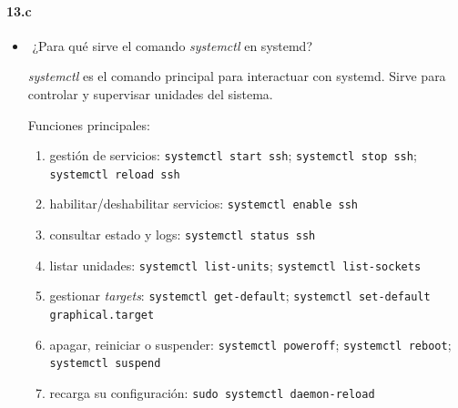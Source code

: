 \documentclass[10pt,a4paper]{paper}
\begin{document}
\paragraph{13.c}
\begin{itemize}
	
	\item​ ¿Para qué sirve el comando \textit{systemctl} en systemd?
	
	\textit{systemctl} es el comando principal para interactuar con systemd. Sirve para controlar y supervisar unidades del sistema.
	
	Funciones principales:
	
	\begin{enumerate}
		\item gestión de servicios: \texttt{systemctl start ssh}; \texttt{systemctl stop ssh}; \texttt{systemctl reload ssh}
		
		\item habilitar/deshabilitar servicios: \texttt{systemctl enable ssh}
		
		\item consultar estado y logs: \texttt{systemctl status ssh}
		
		
		\item listar unidades: \texttt{systemctl list-units}; \texttt{systemctl list-sockets}
		
		\item gestionar \textit{targets}: \texttt{systemctl get-default}; \texttt{systemctl set-default graphical.target}
		
		\item apagar, reiniciar o suspender: \texttt{systemctl poweroff}; \texttt{systemctl reboot}; \texttt{systemctl suspend}
		
		\item recarga su configuración: \texttt{sudo systemctl daemon-reload}
	\end{enumerate}
	
	
	
	
\end{itemize}
\end{document}
